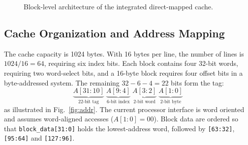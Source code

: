 \documentclass[conference,a4paper]{IEEEtran}
\begin{document}
\begin{figure}[!t]
\centering
{}
\caption{Block-level architecture of the integrated direct-mapped cache.}\label{fig:arch}
\end{figure}

\subsection{Cache Organization and Address Mapping}\label{sec:map}
The cache capacity is 1024 bytes. With 16 bytes per line, the number of lines is $1024/16 = 64$, requiring six index bits. Each block contains four 32-bit words, requiring two word-select bits, and a 16-byte block requires four offset bits in a byte-addressed system. The remaining $32-6-4 = 22$ bits form the tag:
\begin{equation}
\underbrace{A[31{:}10]}_{\text{22-bit tag}}\;
\underbrace{A[9{:}4]}_{\text{6-bit index}}\;
\underbrace{A[3{:}2]}_{\text{2-bit word}}\;
\underbrace{A[1{:}0]}_{\text{2-bit byte}}
\label{eq:addr}
\end{equation}
as illustrated in Fig.~\ref{fig:addr}. The current processor interface is word oriented and assumes word-aligned accesses ($A[1{:}0]=00$). Block data are ordered so that \texttt{block\_data[31:0]} holds the lowest-address word, followed by \texttt{[63:32]}, \texttt{[95:64]} and \texttt{[127:96]}.
\end{document}

